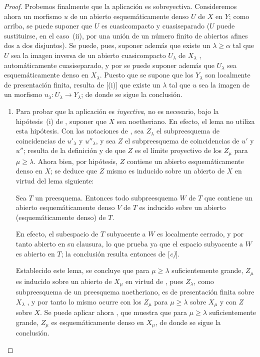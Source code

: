 \begin{proof}
Probemos finalmente que la aplicación  es sobreyectiva.
Consideremos ahora un morfismo $u$ de un abierto esquemáticamente denso $U$ de $X$ en $Y$; como arriba, se puede suponer que $U$ es cuasicompacto y cuasiseparado ($U$ puede sustituirse, en el caso~(ii), por una unión de un número finito de abiertos afines dos a dos disjuntos).
Se puede, pues, suponer además que existe un $\lambda\geq\alpha$ tal que $U$ sea la imagen inversa de un abierto cuasicompacto $U_\lambda$ de $X_\lambda$ , automáticamente cuasiseparado, y por  se puede suponer además que $U_\lambda$ sea esquemáticamente denso en $X_\lambda$.
Puesto que se supone que los $Y_\lambda$ son localmente de presentación finita, resulta de [(i)] que existe un $\lambda$ tal que $u$ sea la imagen de un morfismo $u_\lambda:U_\lambda\to Y_\lambda$; de donde se sigue la conclusión.

\begin{remarks}[20.3.8.7]
\label{IV.20.3.8.7}
\begin{enumerate}[label=(\roman*)]
  \item Para probar que la aplicación  es \emph{inyectiva}, no es necesario, bajo la hipótesis~(i) de , suponer que $X$ sea noetheriano.
  En efecto, el lema  no utiliza esta hipótesis.
  Con las notaciones de , sea $Z_\lambda$ el subpreesquema de coincidencias de $u'_\lambda$ y $u''_\lambda$, y sea $Z$ el subpreesquema de coincidencias de $u'$ y $u''$; resulta de la definición  y de  que $Z$ es el límite proyectivo de los $Z_\mu$ para $\mu\geq\lambda$.
  Ahora bien, por hipótesis, $Z$ contiene un abierto esquemáticamente denso en $X$; se deduce que $Z$ mismo es inducido sobre un abierto de $X$ en virtud del lema siguiente:

\begin{lemma}[20.3.8.8]
\label{IV.20.3.8.8}
Sea $T$ un preesquema.
Entonces todo subpreesquema $W$ de $T$ que contiene un abierto esquemáticamente denso $V$ de $T$ es inducido sobre un abierto (esquemáticamente denso) de $T$.
\end{lemma}

  En efecto, el subespacio de $T$ subyacente a $W$ es localmente cerrado, y por tanto abierto
  en su clausura, lo que prueba ya que el espacio subyacente a $W$ es abierto en $T$; la conclusión resulta entonces de [\emph{c)}].

  Establecido este lema, se concluye que para $\mu\geq\lambda$ suficientemente grande, $Z_\mu$ es inducido sobre un abierto de $X_\mu$ en virtud de , pues $Z_\lambda$, como subpreesquema de un preesquema noetheriano, es de presentación finita sobre $X_\lambda$ , y por tanto lo mismo ocurre con los $Z_\mu$ para $\mu\geq\lambda$ sobre $X_\mu$ y con $Z$ sobre $X$.
  Se puede aplicar ahora , que muestra que para $\mu\geq\lambda$ suficientemente grande, $Z_\mu$ es esquemáticamente denso en $X_\mu$, de donde se sigue la conclusión.


\end{enumerate}
\end{remarks}
\end{proof}
